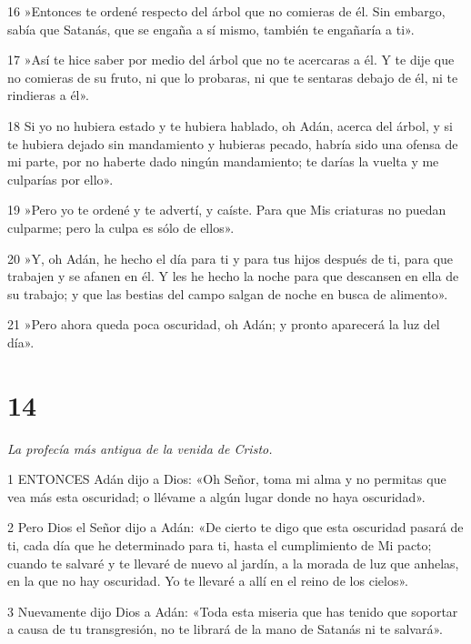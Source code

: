 \par 16 »Entonces te ordené respecto del árbol que no comieras de él. Sin embargo, sabía que Satanás, que se engaña a sí mismo, también te engañaría a ti».

\par 17 »Así te hice saber por medio del árbol que no te acercaras a él. Y te dije que no comieras de su fruto, ni que lo probaras, ni que te sentaras debajo de él, ni te rindieras a él».

\par 18 Si yo no hubiera estado y te hubiera hablado, oh Adán, acerca del árbol, y si te hubiera dejado sin mandamiento y hubieras pecado, habría sido una ofensa de mi parte, por no haberte dado ningún mandamiento; te darías la vuelta y me culparías por ello».

\par 19 »Pero yo te ordené y te advertí, y caíste. Para que Mis criaturas no puedan culparme; pero la culpa es sólo de ellos».

\par 20 »Y, oh Adán, he hecho el día para ti y para tus hijos después de ti, para que trabajen y se afanen en él. Y les he hecho la noche para que descansen en ella de su trabajo; y que las bestias del campo salgan de noche en busca de alimento».

\par 21 »Pero ahora queda poca oscuridad, oh Adán; y pronto aparecerá la luz del día».

\chapter{14}

\par \textit{La profecía más antigua de la venida de Cristo.}

\par 1 ENTONCES Adán dijo a Dios: «Oh Señor, toma mi alma y no permitas que vea más esta oscuridad; o llévame a algún lugar donde no haya oscuridad».

\par 2 Pero Dios el Señor dijo a Adán: «De cierto te digo que esta oscuridad pasará de ti, cada día que he determinado para ti, hasta el cumplimiento de Mi pacto; cuando te salvaré y te llevaré de nuevo al jardín, a la morada de luz que anhelas, en la que no hay oscuridad. Yo te llevaré a allí en el reino de los cielos».

\par 3 Nuevamente dijo Dios a Adán: «Toda esta miseria que has tenido que soportar a causa de tu transgresión, no te librará de la mano de Satanás ni te salvará».

